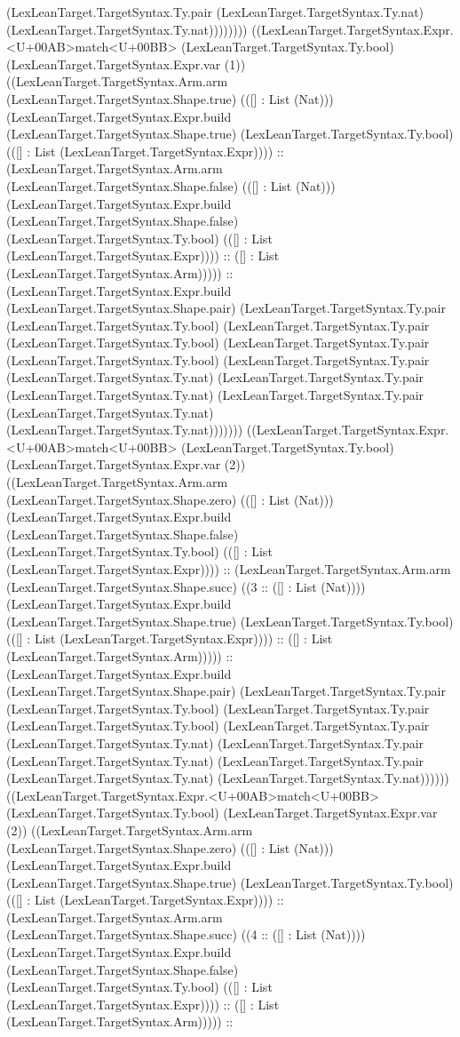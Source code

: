 \documentclass[11pt]{article}
\begin{document}
(LexLeanTarget.TargetSyntax.Ty.pair (LexLeanTarget.TargetSyntax.Ty.nat) (LexLeanTarget.TargetSyntax.Ty.nat)))))))) ((LexLeanTarget.TargetSyntax.Expr.<U+00AB>match<U+00BB> (LexLeanTarget.TargetSyntax.Ty.bool) (LexLeanTarget.TargetSyntax.Expr.var (1)) ((LexLeanTarget.TargetSyntax.Arm.arm (LexLeanTarget.TargetSyntax.Shape.true) (([] : List (Nat))) (LexLeanTarget.TargetSyntax.Expr.build (LexLeanTarget.TargetSyntax.Shape.true) (LexLeanTarget.TargetSyntax.Ty.bool) (([] : List (LexLeanTarget.TargetSyntax.Expr)))) :: (LexLeanTarget.TargetSyntax.Arm.arm (LexLeanTarget.TargetSyntax.Shape.false) (([] : List (Nat))) (LexLeanTarget.TargetSyntax.Expr.build (LexLeanTarget.TargetSyntax.Shape.false) (LexLeanTarget.TargetSyntax.Ty.bool) (([] : List (LexLeanTarget.TargetSyntax.Expr)))) :: ([] : List (LexLeanTarget.TargetSyntax.Arm))))) :: (LexLeanTarget.TargetSyntax.Expr.build (LexLeanTarget.TargetSyntax.Shape.pair) (LexLeanTarget.TargetSyntax.Ty.pair (LexLeanTarget.TargetSyntax.Ty.bool) (LexLeanTarget.TargetSyntax.Ty.pair (LexLeanTarget.TargetSyntax.Ty.bool) (LexLeanTarget.TargetSyntax.Ty.pair (LexLeanTarget.TargetSyntax.Ty.bool) (LexLeanTarget.TargetSyntax.Ty.pair (LexLeanTarget.TargetSyntax.Ty.nat) (LexLeanTarget.TargetSyntax.Ty.pair (LexLeanTarget.TargetSyntax.Ty.nat) (LexLeanTarget.TargetSyntax.Ty.pair (LexLeanTarget.TargetSyntax.Ty.nat) (LexLeanTarget.TargetSyntax.Ty.nat))))))) ((LexLeanTarget.TargetSyntax.Expr.<U+00AB>match<U+00BB> (LexLeanTarget.TargetSyntax.Ty.bool) (LexLeanTarget.TargetSyntax.Expr.var (2)) ((LexLeanTarget.TargetSyntax.Arm.arm (LexLeanTarget.TargetSyntax.Shape.zero) (([] : List (Nat))) (LexLeanTarget.TargetSyntax.Expr.build (LexLeanTarget.TargetSyntax.Shape.false) (LexLeanTarget.TargetSyntax.Ty.bool) (([] : List (LexLeanTarget.TargetSyntax.Expr)))) :: (LexLeanTarget.TargetSyntax.Arm.arm (LexLeanTarget.TargetSyntax.Shape.succ) ((3 :: ([] : List (Nat)))) (LexLeanTarget.TargetSyntax.Expr.build (LexLeanTarget.TargetSyntax.Shape.true) (LexLeanTarget.TargetSyntax.Ty.bool) (([] : List (LexLeanTarget.TargetSyntax.Expr)))) :: ([] : List (LexLeanTarget.TargetSyntax.Arm))))) :: (LexLeanTarget.TargetSyntax.Expr.build (LexLeanTarget.TargetSyntax.Shape.pair) (LexLeanTarget.TargetSyntax.Ty.pair (LexLeanTarget.TargetSyntax.Ty.bool) (LexLeanTarget.TargetSyntax.Ty.pair (LexLeanTarget.TargetSyntax.Ty.bool) (LexLeanTarget.TargetSyntax.Ty.pair (LexLeanTarget.TargetSyntax.Ty.nat) (LexLeanTarget.TargetSyntax.Ty.pair (LexLeanTarget.TargetSyntax.Ty.nat) (LexLeanTarget.TargetSyntax.Ty.pair (LexLeanTarget.TargetSyntax.Ty.nat) (LexLeanTarget.TargetSyntax.Ty.nat)))))) ((LexLeanTarget.TargetSyntax.Expr.<U+00AB>match<U+00BB> (LexLeanTarget.TargetSyntax.Ty.bool) (LexLeanTarget.TargetSyntax.Expr.var (2)) ((LexLeanTarget.TargetSyntax.Arm.arm (LexLeanTarget.TargetSyntax.Shape.zero) (([] : List (Nat))) (LexLeanTarget.TargetSyntax.Expr.build (LexLeanTarget.TargetSyntax.Shape.true) (LexLeanTarget.TargetSyntax.Ty.bool) (([] : List (LexLeanTarget.TargetSyntax.Expr)))) :: (LexLeanTarget.TargetSyntax.Arm.arm (LexLeanTarget.TargetSyntax.Shape.succ) ((4 :: ([] : List (Nat)))) (LexLeanTarget.TargetSyntax.Expr.build (LexLeanTarget.TargetSyntax.Shape.false) (LexLeanTarget.TargetSyntax.Ty.bool) (([] : List (LexLeanTarget.TargetSyntax.Expr)))) :: ([] : List (LexLeanTarget.TargetSyntax.Arm))))) :: 
\end{document}
